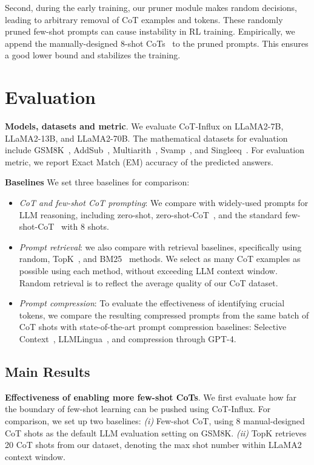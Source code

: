 Second, during the early training, our pruner module makes random decisions, leading to arbitrary removal of CoT examples and tokens. These randomly pruned few-shot prompts can cause instability in RL training. Empirically, we append the manually-designed 8-shot CoTs~\cite{cot} to the pruned prompts. This ensures a good lower bound and stabilizes the training. 

\section{Evaluation}

\textbf{Models, datasets and metric}. We evaluate  {CoT-Influx} on LLaMA2-7B, LLaMA2-13B, and LLaMA2-70B. The mathematical datasets  for evaluation  include GSM8K~\cite{gsm8k}, AddSub~\cite{addsub}, Multiarith~\cite{multiarith}, Svamp~\cite{svamp}, and Singleeq~\cite{singleeq}.  For evaluation metric, we report Exact Match (EM) accuracy of the predicted answers. 

\textbf{Baselines} We set  three  baselines for comparison:

\begin{itemize}[itemsep=2pt,topsep=0pt,parsep=0pt]
    \item \textit{CoT and few-shot CoT prompting}:  We compare with widely-used prompts for LLM reasoning, including zero-shot, zero-shot-CoT~\cite{kojima2022large}, and the standard few-shot-CoT~\cite{cot} with 8 shots. 
    \item \textit{Prompt retrieval}: we also compare with retrieval baselines, specifically using random, TopK~\cite{topk}, and BM25~\cite{robertson2009probabilistic} methods. We select as many CoT examples as possible using each method, without exceeding LLM context window. Random retrieval is   to reflect the average quality of our CoT dataset.  
    \item \textit{Prompt compression}: To evaluate the effectiveness of identifying crucial tokens, we compare the resulting compressed prompts from the same batch of CoT shots with state-of-the-art prompt compression baselines: Selective Context~\cite{li2023compressing}, LLMLingua~\cite{llmlingua}, and compression through GPT-4. 
\end{itemize}

\subsection{Main Results} \label{sec:main_results}

\textbf{Effectiveness of enabling more few-shot CoTs}. We first evaluate how far the boundary of few-shot learning can be pushed using {CoT-Influx}. For comparison, we set up two baselines: \textit{(i)} Few-shot CoT, using 8 manual-designed CoT shots as the default LLM evaluation setting on GSM8K. 
\textit{(ii)} TopK retrieves 20 CoT shots from our dataset, denoting the max shot number within LLaMA2 context window.  

